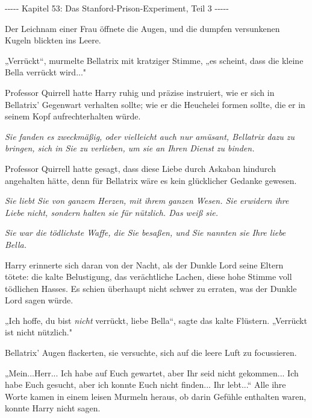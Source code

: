 

\hypertarget{das-stanford-prison-experiment-teil-3}{%

-\/-\/-\/-\/- Kapitel 53: Das Stanford-Prison-Experiment, Teil 3 -\/-\/-\/-\/-

Der Leichnam einer Frau öffnete die Augen, und die dumpfen versunkenen Kugeln blickten ins Leere.

„Verrückt“, murmelte Bellatrix mit kratziger Stimme, „es scheint, dass die kleine Bella verrückt wird..."

Professor Quirrell hatte Harry ruhig und präzise instruiert, wie er sich in Bellatrix' Gegenwart verhalten sollte; wie er die Heuchelei formen sollte, die er in seinem Kopf aufrechterhalten würde.

\emph{\emph{Sie fanden es zweckmäßig, oder vielleicht auch nur amüsant, Bellatrix dazu zu bringen, sich in Sie zu verlieben, um sie an Ihren Dienst zu binden.}}

Professor Quirrell hatte gesagt, dass diese Liebe durch Askaban hindurch angehalten hätte, denn für Bellatrix wäre es kein glücklicher Gedanke gewesen.

\emph{\emph{Sie liebt Sie von ganzem Herzen, mit ihrem ganzen Wesen. Sie erwidern ihre Liebe nicht, sondern halten sie für nützlich. Das weiß sie.}}

\emph{Sie war die tödlichste Waffe, die Sie besaßen, und Sie nannten sie Ihre liebe Bella.}

Harry erinnerte sich daran von der Nacht, als der Dunkle Lord seine Eltern tötete: die kalte Belustigung, das verächtliche Lachen, diese hohe Stimme voll tödlichen Hasses. Es schien überhaupt nicht schwer zu erraten, was der Dunkle Lord sagen würde.

„Ich hoffe, du bist \emph{nicht} verrückt, liebe Bella“, sagte das kalte Flüstern. „Verrückt ist nicht nützlich."

Bellatrix' Augen flackerten, sie versuchte, sich auf die leere Luft zu focussieren.

„Mein...Herr... Ich habe auf Euch gewartet, aber Ihr seid nicht gekommen... Ich habe Euch gesucht, aber ich konnte Euch nicht finden... Ihr lebt...“ Alle ihre Worte kamen in einem leisen Murmeln heraus, ob darin Gefühle enthalten waren, konnte Harry nicht sagen.

}
